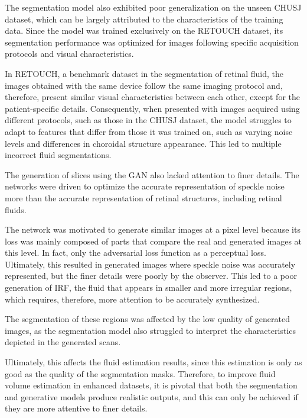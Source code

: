 \par
The segmentation model also exhibited poor generalization on the unseen CHUSJ dataset, which can be largely attributed to the characteristics of the training data. Since the model was trained exclusively on the RETOUCH dataset, its segmentation performance was optimized for images following specific acquisition protocols and visual characteristics.
\par
In RETOUCH, a benchmark dataset in the segmentation of retinal fluid, the images obtained with the same device follow the same imaging protocol and, therefore, present similar visual characteristics between each other, except for the patient-specific  details. Consequently, when presented with images acquired using different protocols, such as those in the CHUSJ dataset, the model struggles to adapt to features that differ from those it was trained on, such as varying noise levels and differences in choroidal structure appearance. This led to multiple incorrect fluid segmentations.
\par
The generation of slices using the GAN also lacked attention to finer details. The networks were driven to optimize the accurate representation of speckle noise more than the accurate representation of retinal structures, including retinal fluids.
\par
The network was motivated to generate similar images at a pixel level because its loss was mainly composed of parts that compare the real and generated images at this level. In fact, only the adversarial loss function as a perceptual loss. Ultimately, this resulted in generated images where speckle noise was accurately represented, but the finer details were poorly by the observer. This led to a poor generation of IRF, the fluid that appears in smaller and more irregular regions, which requires, therefore, more attention to be accurately synthesized. 
\par
The segmentation of these regions was affected by the low quality of generated images, as the segmentation model also struggled to interpret the characteristics depicted in the generated scans.
\par
Ultimately, this affects the fluid estimation results, since this estimation is only as good as the quality of the segmentation masks. Therefore, to improve fluid volume estimation in enhanced datasets, it is pivotal that both the segmentation and generative models produce realistic outputs, and this can only be achieved if they are more attentive to finer details.

